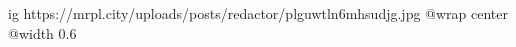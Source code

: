  
 
 
 
 

\ifcmt
  ig https://mrpl.city/uploads/posts/redactor/plguwtln6mhsudjg.jpg
  @wrap center
  @width 0.6
\fi
